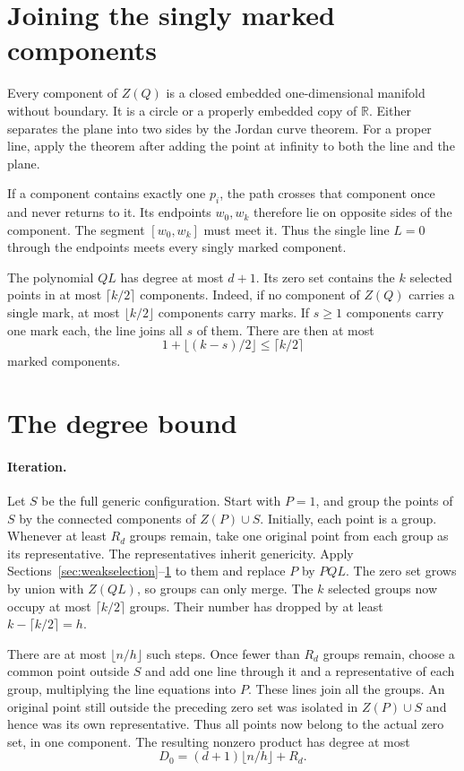 \documentclass[11pt,letterpaper]{article}
\newcommand{\R}{\mathbb R}
\begin{document}
\section{Joining the singly marked components}\label{sec:weakjoining}
Every component of $Z(Q)$ is a closed embedded one-dimensional manifold without boundary. It is a circle or a properly embedded copy of $\R$. Either separates the plane into two sides by the Jordan curve theorem. For a proper line, apply the theorem after adding the point at infinity to both the line and the plane.

If a component contains exactly one $p_i$, the path crosses that component once and never returns to it. Its endpoints $w_0,w_k$ therefore lie on opposite sides of the component. The segment $[w_0,w_k]$ must meet it. Thus the single line $L=0$ through the endpoints meets every singly marked component.

The polynomial $QL$ has degree at most $d+1$. Its zero set contains the $k$ selected points in at most $\lceil k/2\rceil$ components. Indeed, if no component of $Z(Q)$ carries a single mark, at most $\lfloor k/2\rfloor$ components carry marks. If $s\geq1$ components carry one mark each, the line joins all $s$ of them. There are then at most
\[
1+\lfloor(k-s)/2\rfloor\leq\lceil k/2\rceil
\]
marked components.

\section{The degree bound}
\paragraph{Iteration.}
Let $S$ be the full generic configuration. Start with $P=1$, and group the points of $S$ by the connected components of $Z(P)\cup S$. Initially, each point is a group. Whenever at least $R_d$ groups remain, take one original point from each group as its representative. The representatives inherit genericity. Apply Sections~\ref{sec:weakselection}--\ref{sec:weakjoining} to them and replace $P$ by $PQL$. The zero set grows by union with $Z(QL)$, so groups can only merge. The $k$ selected groups now occupy at most $\lceil k/2\rceil$ groups. Their number has dropped by at least $k-\lceil k/2\rceil=h$.

There are at most $\lfloor n/h\rfloor$ such steps. Once fewer than $R_d$ groups remain, choose a common point outside $S$ and add one line through it and a representative of each group, multiplying the line equations into $P$. These lines join all the groups. An original point still outside the preceding zero set was isolated in $Z(P)\cup S$ and hence was its own representative. Thus all points now belong to the actual zero set, in one component. The resulting nonzero product has degree at most
\[
D_0=(d+1)\lfloor n/h\rfloor+R_d.
\]
\end{document}
